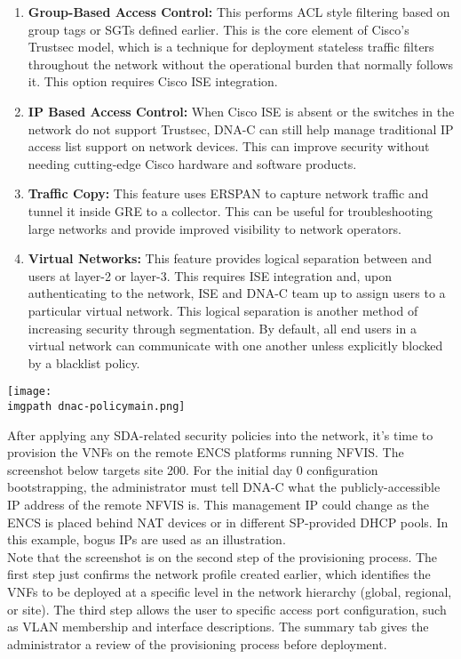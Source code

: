 \begin{enumerate}
  \item \textbf{Group-Based Access Control:} This performs ACL style filtering based
  on group tags or SGTs defined earlier. This is the core element of Cisco's
  Trustsec model, which is a technique for deployment stateless traffic filters
  throughout the network without the operational burden that normally follows
  it. This option requires Cisco ISE integration.
  \item \textbf{IP Based Access Control:} When Cisco ISE is absent or the switches
  in the network do not support Trustsec, DNA-C can still help manage traditional
  IP access list support on network devices. This can improve security without
  needing cutting-edge Cisco hardware and software products.
  \item \textbf{Traffic Copy:} This feature uses ERSPAN to capture network traffic
  and tunnel it inside GRE to a collector. This can be useful for troubleshooting
  large networks and provide improved visibility to network operators.
  \item \textbf{Virtual Networks:} This feature provides logical separation between
  and users at layer-2 or layer-3. This requires ISE integration and, upon
  authenticating to the network, ISE and DNA-C team up to assign users to a
  particular virtual network. This logical separation is another method of
  increasing security through segmentation. By default, all end users in a
  virtual network can communicate with one another unless explicitly blocked by
  a blacklist policy.
\end{enumerate}

    \begin{minipage}[t]{\linewidth}
	  \centering
      \texttt{[image: \\imgpath dnac-policymain.png]}
    \end{minipage}

After applying any SDA-related security policies into the network, it's time
to provision the VNFs on the remote ENCS platforms running NFVIS. The
screenshot below targets site 200. For the initial day 0 configuration
bootstrapping, the administrator must tell DNA-C what the publicly-accessible
IP address of the remote NFVIS is. This management IP could change as the ENCS
is placed behind NAT devices or in different SP-provided DHCP pools. In this
example, bogus IPs are used as an illustration.
\\
Note that the screenshot is on the second step of the provisioning process.
The first step just confirms the network profile created earlier, which
identifies the VNFs to be deployed at a specific level in the network
hierarchy (global, regional, or site). The third step allows the user to
specific access port configuration, such as VLAN membership and interface
descriptions. The summary tab gives the administrator a review of the
provisioning process before deployment.

